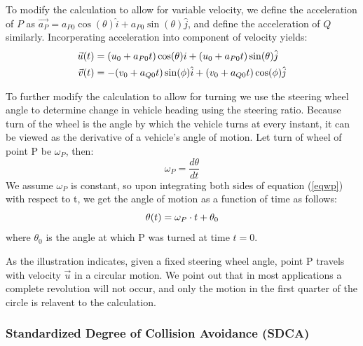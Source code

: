 \documentclass{article}
\begin{document}
To modify the calculation to allow for variable velocity, we define the acceleration of $P$ as $\vec{a_P} = a_{P0}\cos(\theta)\hat{i} + a_{P0}\sin(\theta)\hat{j}$, and define the acceleration of $Q$ similarly.  Incorperating acceleration into component of velocity yields:
\begin{align*}
    \vec{u}(t) &= (u_0 + a_{P0}t) \cos(\theta){i} + (u_0 + a_{P0}t)\sin(\theta) \hat{j} \\
    \vec{v}(t) &= -(v_0+a_{Q0}t) \sin(\phi)\hat{i} + (v_0+a_{Q0}t)\cos(\phi)\hat{j}
\notag
\end{align*}

To further modify the calculation to allow for turning we use the steering wheel angle to determine change in vehicle heading using the steering ratio. Because turn of the wheel is the angle by which the vehicle turns at every instant, it can be viewed as the derivative of a vehicle's angle of motion.  Let turn of wheel of point P be $\omega_P$, then:
\begin{equation}
\omega_P = \frac{d\theta}{dt}   
 \label{eqwp}
\end{equation}
We assume $\omega_P$ is constant, so upon integrating both sides of equation (\ref{eqwp}) with respect to t, we get the angle of motion as a function of time as follows:\\
\begin{equation}
    \theta(t) = \omega_P \cdot t + \theta_0
    \notag
\end{equation}
where $\theta_0$ is the angle at which P was turned at time $t = 0$.\\
\begin{center}
\end{center}
As the illustration indicates, given a fixed steering wheel angle, point P travels with velocity $\vec{u}$ in a circular motion.  We point out that in most applications a complete revolution will not occur, and only the motion in the first quarter of the circle is relavent to the calculation.

\subsubsection{Standardized Degree of Collision Avoidance (SDCA)}
\end{document}
